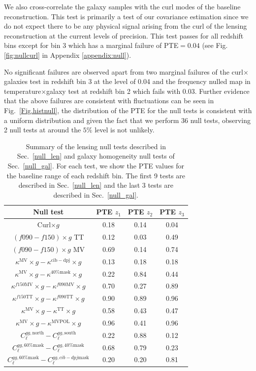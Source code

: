 \documentclass[twocolumn]{aastex631}
\begin{document}
{We also cross-correlate the galaxy samples with the curl modes  of the baseline reconstruction. This test is primarily a test of our covariance estimation since we do not expect there to be any physical signal arising from the curl of the lensing reconstruction at the current levels of precision. This test passes for all redshift bins except for bin 3 which has a marginal failure of PTE$=0.04$ (see Fig. \ref{fig:nullcurl} in Appendix \ref{appendix:null}). 



No significant failures are observed apart from two marginal failures of the curl$\times$galaxies test in redshift bin 3 at the level of 0.04 and the frequency nulled map in temperature$\times$galaxy test at redshift bin 2 which fails with 0.03. Further evidence that the above failures are consistent with fluctuations can be seen in Fig.~\ref{Fig.histnull}, the distribution of the PTE for the null tests is consistent with a uniform distribution and given the fact that we perform 36 null tests, observing 2 null tests at around the $5\%$ level is not unlikely.




\begin{table}
\centering
\caption{Summary of the lensing null tests described in Sec.~\ref{null_len} and galaxy homogeneity null tests of Sec.~\ref{null_gal}. For each test, we show the PTE values for the baseline range of each redshift bin. The first 9 tests are described in Sec.~\ref{null_len} and the last 3 tests are described in Sec.~\ref{null_gal}.}
\label{table:null} 
    \begin{tabular}{c c c c }
     \hline\hline 
     Null test & PTE $z_1$& PTE $z_2$ &  PTE $z_3$ \\ [0.5ex] 
     \hline
     Curl$\times{g}$&0.18&0.14&0.04
     \\
     $(f090-f150)\times{g}$ TT&0.12&0.03&0.49\\
     $(f090-f150)\times{g}$ MV&0.69&0.14&0.74\\
     $\kappa^\mathrm{MV}\times{g}-\kappa^\mathrm{cib-dpj}\times{g}$&0.13&0.18&0.18\\
     $\kappa^\mathrm{MV}\times{g}-\kappa^{40\% \mathrm{mask}}\times{g}$&0.22&0.84&0.44\\
     $\kappa^{f150\mathrm{MV}}\times{g}-\kappa^{f090\mathrm{MV}}\times{g}$&0.70&0.27&0.89\\
     $\kappa^{f150\mathrm{TT}}\times{g}-\kappa^{f090\mathrm{TT}}\times{g}$&0.90&0.89&0.96\\
     $\kappa^{\mathrm{MV}}\times{g}-\kappa^{\mathrm{TT}}\times{g}$&0.58&0.43&0.47\\
     $\kappa^{\mathrm{MV}}\times{g}-\kappa^{\mathrm{MVPOL}}\times{g}$&0.96&0.41&0.96\\
     \hline
     $C^{gg,\mathrm{north }}_\ell-C^{gg,\mathrm{south}}_\ell$ &0.22&0.88&0.12
     \\
    $C^{gg,60\%\mathrm{mask }}_\ell-C^{gg,40\%\mathrm{mask }}_\ell$ &0.68&0.79&0.23\\
    $C^{gg,60\%\mathrm{mask }}_\ell-C^{gg,cib-dpj\mathrm{mask }}_\ell$ &0.20&0.20&0.81\\
     \hline
     

\end{tabular}
\end{table}}
\end{document}
